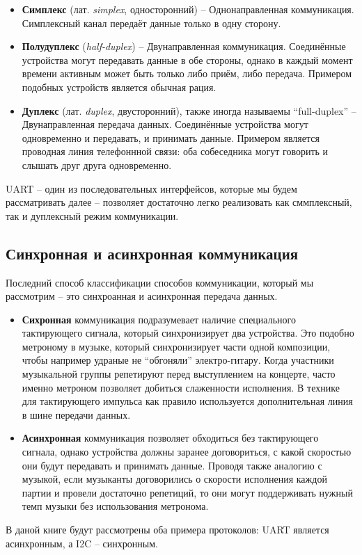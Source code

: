 \documentclass[../sparc.tex]{subfiles}
\begin{document}
\begin{itemize}
\item \textbf{Симплекс} (лат. \emph{simplex}, односторонний) -- Однонаправленная
  коммуникация.  Симплексный канал передаёт данные только в одну сторону.
\item \textbf{Полудуплекс} (\emph{half-duplex}) -- Двунаправленная коммуникация.
  Соединённые устройства могут передавать данные в обе стороны, однако в каждый
  момент времени активным может быть только либо приём, либо передача.  Примером
  подобных устройств является обычная рация.
\item \textbf{Дуплекс} (лат. \emph{duplex}, двусторонний), также иногда
  называемы ``full-duplex'' -- Двунаправленная передача данных.  Соединённые
  устройства могут одновременно и передавать, и принимать данные.  Примером
  является проводная линия телефоннной связи: оба собеседника могут говорить и
  слышать друг друга одновременно.
\end{itemize}

\gls{UART} -- один из последовательных интерфейсов, которые мы будем
рассматривать далее -- позволяет достаточно легко реализовать как сммплексный,
так и дуплексный режим коммуникации.

\subsection{Синхронная и асинхронная коммуникация}

Последний способ классификации способов коммуникации, который мы рассмотрим --
это синхроанная и асинхронная передача данных.

\begin{itemize}
\item \textbf{Сихронная} коммуникация подразумевает наличие специального
  тактирующего сигнала, который синхронизирует два устройства.  Это подобно
  метроному в музыке, который синхронизирует части одной композиции, чтобы
  например удраные не ``обгоняли'' электро-гитару.  Когда участники музыкальной
  группы репетируют перед выступлением на концерте, часто именно метроном
  позволяет добиться слаженности исполнения.  В технике для тактирующего
  импульса как правило используется дополнительная линия в шине передачи данных.
\item \textbf{Асинхронная} коммуникация позволяет обходиться без тактирующего
  сигнала, однако устройства должны заранее договориться, с какой скоростью они
  будут передавать и принимать данные.  Проводя также аналогию с музыкой, если
  музыканты договорились о скорости исполнения каждой партии и провели
  достаточно репетиций, то они могут поддерживать нужный темп музыки без
  использования метронома.
\end{itemize}

В даной книге будут рассмотрены оба примера протоколов: \gls{UART} является
асинхронным, а \gls{I2C} -- синхронным.
\end{document}

